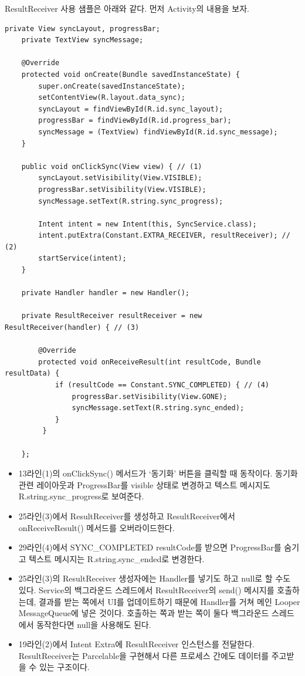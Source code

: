 ResultReceiver 사용 샘플은 아래와 같다. 먼저 Activity의 내용을 보자. 
\begin{lstlisting}[frame=single]
	private View syncLayout, progressBar;
	private TextView syncMessage;

	@Override
	protected void onCreate(Bundle savedInstanceState) {
   		super.onCreate(savedInstanceState);
   		setContentView(R.layout.data_sync);
   		syncLayout = findViewById(R.id.sync_layout);
   		progressBar = findViewById(R.id.progress_bar);
  	 	syncMessage = (TextView) findViewById(R.id.sync_message);
	}

	public void onClickSync(View view) { // (1)
   		syncLayout.setVisibility(View.VISIBLE);
   		progressBar.setVisibility(View.VISIBLE);
   		syncMessage.setText(R.string.sync_progress);

   		Intent intent = new Intent(this, SyncService.class);
   		intent.putExtra(Constant.EXTRA_RECEIVER, resultReceiver); // (2)
   		startService(intent);
	}

	private Handler handler = new Handler();

	private ResultReceiver resultReceiver = new ResultReceiver(handler) { // (3)

   		@Override
   		protected void onReceiveResult(int resultCode, Bundle resultData) {
      		if (resultCode == Constant.SYNC_COMPLETED) { // (4)
         		progressBar.setVisibility(View.GONE);
        		syncMessage.setText(R.string.sync_ended); 
      		}
  		 }

	};	
\end{lstlisting}
\begin{itemize}
\item 13라인(1)의 onClickSync() 메서드가 `동기화' 버튼을 클릭할 때 동작이다. 동기화 관련 레이아웃과 ProgressBar를 visible 상태로 변경하고 텍스트 메시지도 R.string.sync\_progress로 보여준다.
\item 25라인(3)에서 ResultReceiver를 생성하고 ResultReceiver에서 onReceiveResult() 메서드를 오버라이드한다. 
\item 29라인(4)에서 SYNC\_COMPLETED resultCode를 받으면 ProgressBar를 숨기고 텍스트 메시지는 R.string.sync\_ended로 변경한다. 
\item 25라인(3)의 ResultReceiver 생성자에는 Handler를 넣기도 하고 null로 할 수도 있다. 
Service의 백그라운드 스레드에서 ResultReceiver의 send() 메시지를 호출하는데, 결과를 받는 쪽에서 UI를 업데이트하기 때문에 Handler를 거쳐 메인 Looper MessageQueue에 넣은 것이다. 호출하는 쪽과 받는 쪽이 둘다 백그라운드 스레드에서 동작한다면 null을 사용해도 된다.
\item 19라인(2)에서 Intent Extra에 ResultReceiver 인스턴스를 전달한다. ResultReceiver는 Parcelable을 구현해서 다른 프로세스 간에도 데이터를 주고받을 수 있는 구조이다.
\end{itemize}

